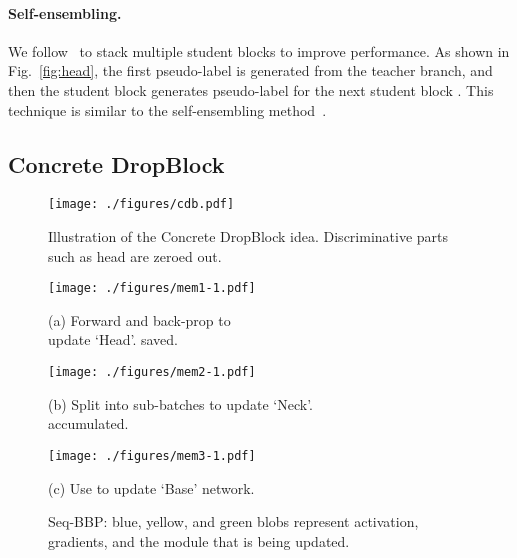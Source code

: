 \documentclass[10pt,twocolumn,letterpaper]{article}
\begin{document}
\vspace{-0.5em}
\paragraph{Self-ensembling.}
We follow~\cite{tang2017multiple, tang2018pcl} to stack multiple student blocks to improve  performance. As shown in Fig.~\ref{fig:head}, the first pseudo-label  is generated from the teacher branch, and then the student block   generates  pseudo-label  for the next student block . This technique is similar to the self-ensembling method~\cite{Laine2017}. 

\subsection{Concrete DropBlock}
\label{sec:dropout}

\begin{figure}[t]
\centering
\texttt{[image: ./figures/cdb.pdf]}
\vspace{-2em}
\caption{Illustration of the Concrete DropBlock idea. Discriminative parts such as head are zeroed out.} 
\label{fig:dropblock}
\vspace{-1em}
\end{figure}

\begin{figure*}[t]
\centering
\begin{minipage}{.28\textwidth}
\centering
\texttt{[image: ./figures/mem1-1.pdf]}
\vspace{-2.5em}
\captionsetup{labelformat=empty}
\caption{(a) Forward and back-prop to \\update `Head'.  saved.}
\end{minipage}
\begin{minipage}{.48\textwidth}
\centering
\texttt{[image: ./figures/mem2-1.pdf]}
\vspace{-2.5em}
\captionsetup{labelformat=empty}
\caption{(b) Split  into sub-batches to update `Neck'. \\ accumulated.}
\end{minipage}
\begin{minipage}{.19\textwidth}
\centering
\texttt{[image: ./figures/mem3-1.pdf]}
\vspace{-2em}
\captionsetup{labelformat=empty}
\caption{(c) Use  to update `Base' network. }
\end{minipage}
\vspace{-1em}
\caption{Seq-BBP:  {\color{blue}blue}, {\color{yellow}yellow}, and {\color{green}green} blobs represent activation, gradients, and the module that is being updated.}
\label{fig:step-bp}
\vspace{-1.5em}
\end{figure*}
\end{document}

